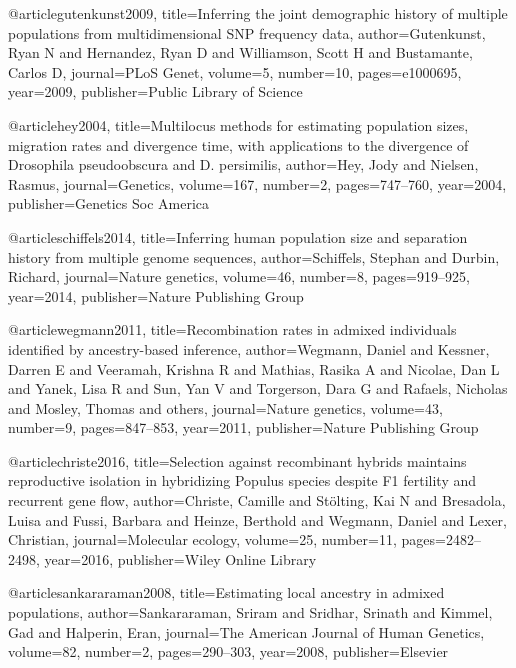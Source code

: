 @article{gutenkunst2009,
  title={Inferring the joint demographic history of multiple populations from multidimensional SNP frequency data},
  author={Gutenkunst, Ryan N and Hernandez, Ryan D and Williamson, Scott H and Bustamante, Carlos D},
  journal={PLoS Genet},
  volume={5},
  number={10},
  pages={e1000695},
  year={2009},
  publisher={Public Library of Science}
}

@article{hey2004,
  title={Multilocus methods for estimating population sizes, migration rates and divergence time, with applications to the divergence of Drosophila pseudoobscura and D. persimilis},
  author={Hey, Jody and Nielsen, Rasmus},
  journal={Genetics},
  volume={167},
  number={2},
  pages={747--760},
  year={2004},
  publisher={Genetics Soc America}
}

@article{schiffels2014,
  title={Inferring human population size and separation history from multiple genome sequences},
  author={Schiffels, Stephan and Durbin, Richard},
  journal={Nature genetics},
  volume={46},
  number={8},
  pages={919--925},
  year={2014},
  publisher={Nature Publishing Group}
}

@article{wegmann2011,
  title={Recombination rates in admixed individuals identified by ancestry-based inference},
  author={Wegmann, Daniel and Kessner, Darren E and Veeramah, Krishna R and Mathias, Rasika A and Nicolae, Dan L and Yanek, Lisa R and Sun, Yan V and Torgerson, Dara G and Rafaels, Nicholas and Mosley, Thomas and others},
  journal={Nature genetics},
  volume={43},
  number={9},
  pages={847--853},
  year={2011},
  publisher={Nature Publishing Group}
}


@article{christe2016,
  title={Selection against recombinant hybrids maintains reproductive isolation in hybridizing Populus species despite F1 fertility and recurrent gene flow},
  author={Christe, Camille and St{\"o}lting, Kai N and Bresadola, Luisa and Fussi, Barbara and Heinze, Berthold and Wegmann, Daniel and Lexer, Christian},
  journal={Molecular ecology},
  volume={25},
  number={11},
  pages={2482--2498},
  year={2016},
  publisher={Wiley Online Library}
}

@article{sankararaman2008,
  title={Estimating local ancestry in admixed populations},
  author={Sankararaman, Sriram and Sridhar, Srinath and Kimmel, Gad and Halperin, Eran},
  journal={The American Journal of Human Genetics},
  volume={82},
  number={2},
  pages={290--303},
  year={2008},
  publisher={Elsevier}
}

